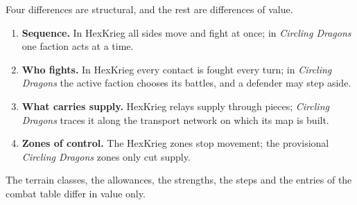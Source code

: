 \documentclass[11pt]{article}
\begin{document}
Four differences are structural, and the rest are differences of value.
\begin{enumerate}
\item \textbf{Sequence.} In HexKrieg all sides move and fight at once; in \emph{Circling Dragons} one faction acts at a time.
\item \textbf{Who fights.} In HexKrieg every contact is fought every turn; in \emph{Circling Dragons} the active faction chooses its battles, and a defender may step aside.
\item \textbf{What carries supply.} HexKrieg relays supply through pieces; \emph{Circling Dragons} traces it along the transport network on which its map is built.
\item \textbf{Zones of control.} The HexKrieg zones stop movement; the provisional \emph{Circling Dragons} zones only cut supply.
\end{enumerate}
The terrain classes, the allowances, the strengths, the steps and the entries of the combat table differ in value only.
\end{document}
